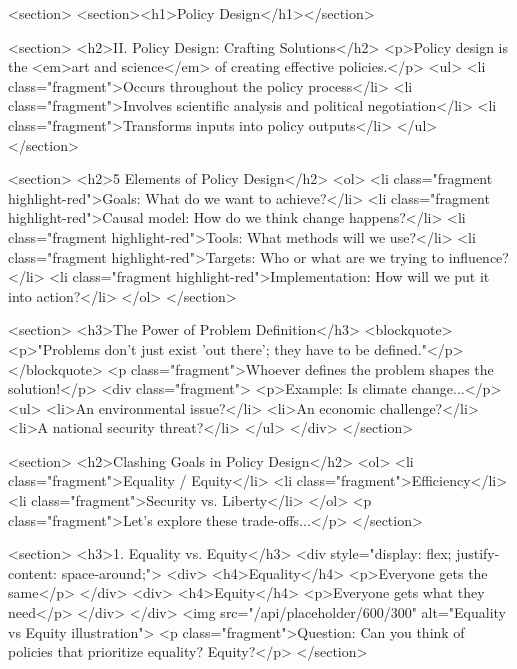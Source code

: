 <section>
            <section><h1>Policy Design</h1></section>   
            
            <section>
                <h2>II. Policy Design: Crafting Solutions</h2>
                <p>Policy design is the <em>art and science</em> of creating effective policies.</p>
                <ul>
                    <li class="fragment">Occurs throughout the policy process</li>
                    <li class="fragment">Involves scientific analysis and political negotiation</li>
                    <li class="fragment">Transforms inputs into policy outputs</li>
                </ul>
            </section>

            <section>
                <h2>5 Elements of Policy Design</h2>
                <ol>
                    <li class="fragment highlight-red">Goals: What do we want to achieve?</li>
                    <li class="fragment highlight-red">Causal model: How do we think change happens?</li>
                    <li class="fragment highlight-red">Tools: What methods will we use?</li>
                    <li class="fragment highlight-red">Targets: Who or what are we trying to influence?</li>
                    <li class="fragment highlight-red">Implementation: How will we put it into action?</li>
                </ol>
            </section>

            <section>
                <h3>The Power of Problem Definition</h3>
                <blockquote>
                    <p>"Problems don't just exist 'out there'; they have to be defined."</p>
                </blockquote>
                <p class="fragment">Whoever defines the problem shapes the solution!</p>
                <div class="fragment">
                    <p>Example: Is climate change...</p>
                    <ul>
                        <li>An environmental issue?</li>
                        <li>An economic challenge?</li>
                        <li>A national security threat?</li>
                    </ul>
                </div>
            </section>

            <section>
                <h2>Clashing Goals in Policy Design</h2>
                <ol>
                    <li class="fragment">Equality / Equity</li>
                    <li class="fragment">Efficiency</li>
                    <li class="fragment">Security vs. Liberty</li>
                </ol>
                <p class="fragment">Let's explore these trade-offs...</p>
            </section>

            <section>
                <h3>1. Equality vs. Equity</h3>
                <div style="display: flex; justify-content: space-around;">
                    <div>
                        <h4>Equality</h4>
                        <p>Everyone gets the same</p>
                    </div>
                    <div>
                        <h4>Equity</h4>
                        <p>Everyone gets what they need</p>
                    </div>
                </div>
                <img src="/api/placeholder/600/300" alt="Equality vs Equity illustration">
                <p class="fragment">Question: Can you think of policies that prioritize equality? Equity?</p>
            </section>

